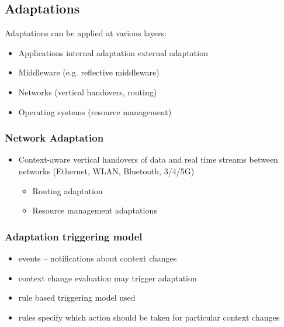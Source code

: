 \subsection{Adaptations}
Adaptations can be applied at various layers:
\begin{itemize}
	\item Applications
	\subitem internal adaptation
	\subitem external adaptation
	\item Middleware (e.g. reflective middleware)
	\item Networks (vertical handovers, routing)
	\item Operating systems (resource management)	
\end{itemize}

\subsubsection{Network Adaptation}
\begin{itemize}
	\item Context-aware vertical handovers of data and real time streams between networks (Ethernet, WLAN, Bluetooth, 3/4/5G)
	\begin{itemize}
		\item Routing adaptation
		\item Resource management adaptations
	\end{itemize}	
\end{itemize}

\subsubsection{Adaptation triggering model}
\begin{itemize}
	\item events -- notifications about context changes
	\item context change evaluation may trigger adaptation
	\item rule based triggering model used
	\item rules specify which action should be taken for particular context changes	
\end{itemize}

